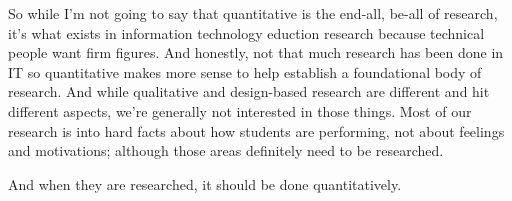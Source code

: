 \documentclass[man,natbib]{apa6}
\begin{document}
So while I'm not going to say that quantitative is the end-all, be-all of research, it's what exists in information technology eduction research because technical people want firm figures. And honestly, not that much research has been done in IT so quantitative makes more sense to help establish a foundational body of research. And while qualitative and design-based research are different and hit different aspects, we're generally not interested in those things. Most of our research is into hard facts about how students are performing, not about feelings and motivations; although those areas definitely need to be researched.

And when they are researched, it should be done quantitatively.


\end{document}
